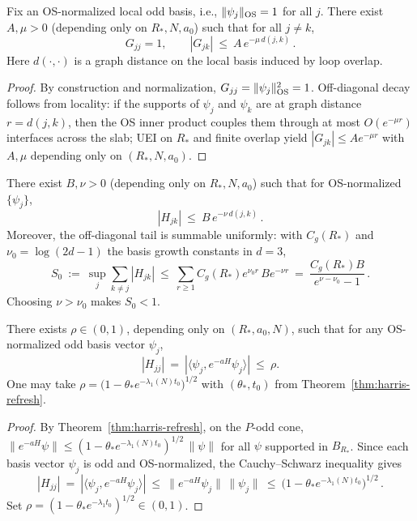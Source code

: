 \documentclass[11pt]{amsart}
\begin{document}
\begin{lemma}\label{lem:local-gram-bounds}
Fix an OS-normalized local odd basis, i.e., $\|\psi_j\|_{\rm OS}=1$ for all $j$. There exist $A,\mu>0$ (depending only on $R_*,N,a_0$) such that for all $j\ne k$,
\[
  G_{jj}=1,\qquad |G_{jk}|\ \le\ A\,e^{-\mu\, d(j,k)}\,.
\]
Here $d(\cdot,\cdot)$ is a graph distance on the local basis induced by loop overlap.
\end{lemma}

\begin{proof}
By construction and normalization, $G_{jj}=\|\psi_j\|_{\rm OS}^2=1$. Off-diagonal decay follows from locality: if the supports of $\psi_j$ and $\psi_k$ are at graph distance $r=d(j,k)$, then the OS inner product couples them through at most $O(e^{-\mu r})$ interfaces across the slab; UEI on $R_*$ and finite overlap yield $|G_{jk}|\le A e^{-\mu r}$ with $A,\mu$ depending only on $(R_*,N,a_0)$.
\end{proof}

\begin{lemma}\label{lem:mixed-gram-bound}
There exist $B,\nu>0$ (depending only on $R_*,N,a_0$) such that for OS-normalized $\{\psi_j\}$,
\[
  |H_{jk}|\ \le\ B\,e^{-\nu\,d(j,k)}\,.
\]
Moreover, the off-diagonal tail is summable uniformly: with $C_g(R_*)$ and $\nu_0=\log(2d-1)$ the basis growth constants in $d=3$,
\[
  S_0\ :=\ \sup_j \sum_{k\ne j} |H_{jk}|\ \le\ \sum_{r\ge 1} C_g(R_*) e^{\nu_0 r}\, B e^{-\nu r}\ =\ \frac{C_g(R_*) B}{e^{\nu-\nu_0}-1}\,.
\]
Choosing $\nu>\nu_0$ makes $S_0<1$.
\end{lemma}

\begin{lemma}\label{lem:diag-mixed-bound}
There exists $\rho\in(0,1)$, depending only on $(R_*,a_0,N)$, such that for any OS-normalized odd basis vector $\psi_j$,
\[
  |H_{jj}|\ =\ |\langle\psi_j, e^{-aH}\psi_j\rangle|\ \le\ \rho.
\]
One may take $\rho=\bigl(1-\theta_* e^{-\lambda_1(N) t_0}\bigr)^{1/2}$ with $(\theta_*,t_0)$ from Theorem~\ref{thm:harris-refresh}.
\end{lemma}

\begin{proof}
By Theorem~\ref{thm:harris-refresh}, on the $P$-odd cone, $\|e^{-aH}\psi\|\le (1-\theta_* e^{-\lambda_1(N) t_0})^{1/2}\,\|\psi\|$ for all $\psi$ supported in $B_{R_*}$. Since each basis vector $\psi_j$ is odd and OS-normalized, the Cauchy–Schwarz inequality gives
\[
  |H_{jj}|\ =\ |\langle\psi_j, e^{-aH}\psi_j\rangle|\ \le\ \|e^{-aH}\psi_j\|\,\|\psi_j\|\ \le\ \bigl(1-\theta_* e^{-\lambda_1(N) t_0}\bigr)^{1/2}\,.
\]
Set $\rho=(1-\theta_* e^{-\lambda_1 t_0})^{1/2}\in(0,1)$.
\end{proof}
\end{document}

